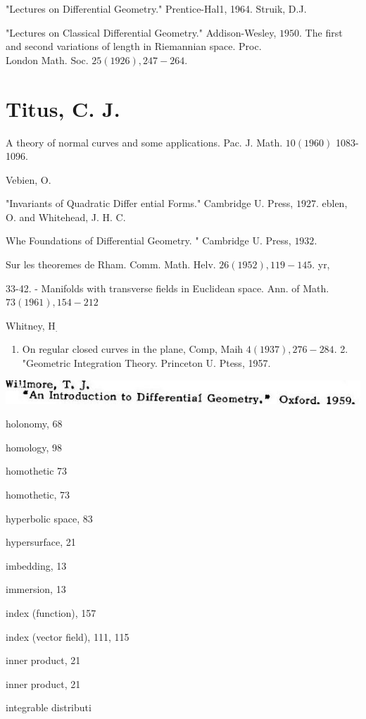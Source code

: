 \documentclass[10pt]{article}
\begin{document}
"Lectures on Differential Geometry." Prentice-Hal1, 1964. Struik, D.J.

"Lectures on Classical Differential Geometry." Addison-Wesley, $1950 .$ The first and second variations of length in Riemannian space. Proc.\\
London Math. Soc. $25(1926), 247-264 .$

\section{Titus, C. J.}
A theory of normal curves and some applications. Pac. J. Math. $10(1960)$ 1083-1096.

Vebien, O.

"Invariants of Quadratic Differ ential Forms." Cambridge U. Press, $1927 .$ eblen, O. and Whitehead, J. H. C.

Whe Foundations of Differential Geometry. " Cambridge U. Press, $1932 .$

Sur les theoremes de Rham. Comm. Math. Helv. $26(1952), 119-145 .$ yr,

33-42. - Manifolds with transverse fields in Euclidean space. Ann. of Math. $73(1961), 154-212$

Whitney, $\mathrm{H}_{\text {. }}$

\begin{enumerate}
  \item On regular closed curves in the plane, Comp, Maih $4(1937), 276-284 .$ 2. "Geometric Integration Theory. Princeton U. Ptess, 1957.
\end{enumerate}
\includegraphics[max width=\textwidth]{2022_07_16_f4e476ee2159dc67e746g-94}

holonomy, 68

homology, 98

homothetic 73

homothetic, 73

hyperbolic space, 83

hypersurface, 21

imbedding, 13

immersion, 13

index (function), 157

index (vector field), 111, 115

inner product, 21

inner product, 21

integrable distributi
\end{document}
